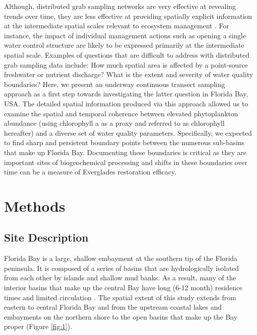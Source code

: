 Although, distributed grab sampling networks are very effective at revealing trends over time, they are less effective at providing spatially explicit information at the intermediate spatial scales relevant to ecosystem management \citep{anttila2008feasible}. For instance, the impact of individual management actions such as opening a single water control structure are likely to be expressed primarily at the intermediate spatial scale. Examples of questions that are difficult to address with distributed grab sampling data include: How much spatial area is affected by a point-source freshwater or nutrient discharge? What is the extent and severity of water quality boundaries? Here, we present an underway continuous transect sampling approach as a first step towards investigating the latter question in Florida Bay, USA. The detailed spatial information produced via this approach allowed us to examine the spatial and temporal coherence between elevated phytoplankton abundance (using chlorophyll a as a proxy and referred to as chlorophyll hereafter) and a diverse set of water quality parameters. Specifically, we expected to find sharp and persistent boundary points between the numerous sub-basins that make up Florida Bay. Documenting these boundaries is critical as they are important sites of biogeochemical processing and shifts in these boundaries over time can be a measure of Everglades restoration efficacy.
\section{Methods}
\label{methods}
\subsection{Site Description}
\label{sitedescription}
Florida Bay is a large, shallow embayment at the southern tip of the Florida peninsula. It is composed of a series of basins that are hydrologically isolated from each other by islands and shallow mud banks. As a result, many of the interior basins that make up the central Bay have long (6-12 month) residence times and limited circulation \citep{lee2016circulation}. The spatial extent of this study extends from eastern to central Florida Bay and from the upstream coastal lakes and embayments on the northern shore to the open basins that make up the Bay proper (Figure \ref{fig:1}). 

